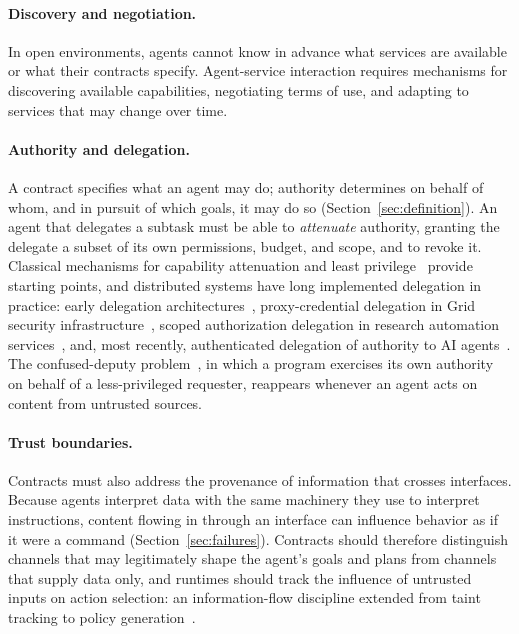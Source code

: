 \documentclass[11pt]{article}
\begin{document}
\paragraph{Discovery and negotiation.} In open environments, agents cannot know in advance what services are available or what their contracts specify. Agent-service interaction requires mechanisms for discovering available capabilities, negotiating terms of use, and adapting to services that may change over time.

\paragraph{Authority and delegation.} A contract specifies what an agent may do; authority determines on behalf of whom, and in pursuit of which goals, it may do so (Section~\ref{sec:definition}). An agent that delegates a subtask must be able to \textit{attenuate} authority, granting the delegate a subset of its own permissions, budget, and scope, and to revoke it. Classical mechanisms for capability attenuation and least privilege~\cite{dennis_capabilities,saltzer_protection} provide starting points, and distributed systems have long implemented delegation in practice: early delegation architectures~\cite{gasser_delegation}, proxy-credential delegation in Grid security infrastructure~\cite{foster_gsi}, scoped authorization delegation in research automation services~\cite{chard_globus_automation}, and, most recently, authenticated delegation of authority to AI agents~\cite{south_delegation}. The confused-deputy problem~\cite{hardy_deputy}, in which a program exercises its own authority on behalf of a less-privileged requester, reappears whenever an agent acts on content from untrusted sources.

\paragraph{Trust boundaries.} Contracts must also address the provenance of information that crosses interfaces. Because agents interpret data with the same machinery they use to interpret instructions, content flowing in through an interface can influence behavior as if it were a command (Section~\ref{sec:failures}). Contracts should therefore distinguish channels that may legitimately shape the agent's goals and plans from channels that supply data only, and runtimes should track the influence of untrusted inputs on action selection: an information-flow discipline extended from taint tracking to policy generation~\cite{debenedetti_camel}.
\end{document}
